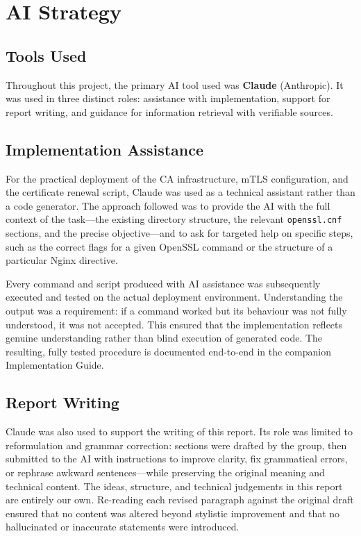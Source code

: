 \documentclass[10pt,twocolumn]{article}
\newcommand{\IGbase}{https://github.com/willLeckyThom/NetworkSecurity/blob/main/Projet/certificate_chain.md}
\newif\ifIGhref
\newcommand{\IGdoc}[1]{\ifIGhref\href{\IGbase}{#1}\else#1\fi}%
\begin{document}
\section{AI Strategy}

\subsection{Tools Used}

Throughout this project, the primary AI tool used was \textbf{Claude}
(Anthropic). It was used in three distinct roles: assistance with
implementation, support for report writing, and guidance for information
retrieval with verifiable sources.

\subsection{Implementation Assistance}

For the practical deployment of the CA infrastructure, mTLS configuration,
and the certificate renewal script, Claude was used as a technical assistant
rather than a code generator. The approach followed was to provide the AI
with the full context of the task---the existing directory structure, the
relevant \texttt{openssl.cnf} sections, and the precise objective---and to
ask for targeted help on specific steps, such as the correct flags for a
given OpenSSL command or the structure of a particular Nginx directive.

Every command and script produced with AI assistance was subsequently
executed and tested on the actual deployment environment. Understanding the
output was a requirement: if a command worked but its behaviour was not
fully understood, it was not accepted. This ensured that the implementation
reflects genuine understanding rather than blind execution of generated code.
The resulting, fully tested procedure is documented end-to-end in the
companion \IGdoc{Implementation Guide}.

\subsection{Report Writing}

Claude was also used to support the writing of this report. Its role was
limited to reformulation and grammar correction: sections were drafted by
the group, then submitted to the AI with instructions to improve clarity,
fix grammatical errors, or rephrase awkward sentences---while preserving
the original meaning and technical content. The ideas, structure, and
technical judgements in this report are entirely our own. Re-reading each
revised paragraph against the original draft ensured that no content was
altered beyond stylistic improvement and that no hallucinated or inaccurate
statements were introduced.
\end{document}
